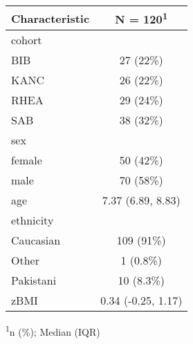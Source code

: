 \captionsetup[table]{labelformat=empty,skip=1pt}
\begin{longtable}{lc}
\toprule
\textbf{Characteristic} & \textbf{N = 120}\textsuperscript{1} \\ 
\midrule
cohort &  \\ 
BIB & 27 (22\%) \\ 
KANC & 26 (22\%) \\ 
RHEA & 29 (24\%) \\ 
SAB & 38 (32\%) \\ 
sex &  \\ 
female & 50 (42\%) \\ 
male & 70 (58\%) \\ 
age & 7.37 (6.89, 8.83) \\ 
ethnicity &  \\ 
Caucasian & 109 (91\%) \\ 
Other & 1 (0.8\%) \\ 
Pakistani & 10 (8.3\%) \\ 
zBMI & 0.34 (-0.25, 1.17) \\ 
 \bottomrule
\end{longtable}
\vspace{-5mm}
\begin{minipage}{\linewidth}
\textsuperscript{1}n (\%); Median (IQR) \\ 
\end{minipage}


